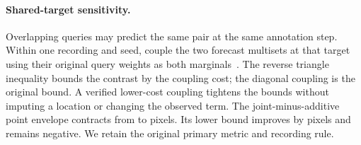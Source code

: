 \paragraph{Shared-target sensitivity.}
Overlapping queries may predict the same pair at the same
annotation step. Within one recording and seed, couple the
two forecast multisets at that target using their original
query weights as both marginals~\cite{peyre}. The reverse
triangle inequality bounds the contrast by the coupling
cost; the diagonal coupling is the original bound. A
verified lower-cost coupling tightens the bounds without
imputing a location or changing the observed term.
The joint-minus-additive point envelope contracts from
\OverlapOld{} to \OverlapNew{} pixels. Its lower bound
improves by \OverlapGain{} pixels and remains negative.
We retain the original primary metric and recording rule.
